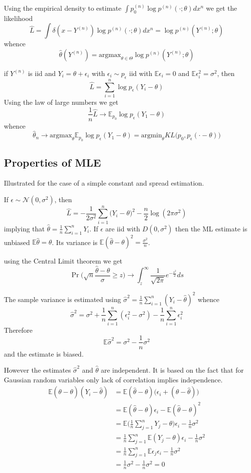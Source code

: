 \documentclass[a4paper]{article}
\newcommand{\Ncal}{\mathcal{N}}
\newcommand{\ex}{\mathbb{E}}
\begin{document}
Using the empirical density to estimate $\int p^{(n)}_0 \log p^{(n)}(\cdot;\theta) dx^n$ we get the likelihood
\[\hat{L} = \int \delta(x-Y^{(n)}) \log p^{(n)}(\cdot;\theta) dx^n = \log p^{(n)}(Y^{(n)};\theta)\]
whence 
\[\hat{\theta}(Y^{(n)}) = \text{argmax}_{\theta\in \Theta} \log p^{(n)}(Y^{(n)};\theta)\]

if $Y^{(n)}$ is iid and $Y_i = \theta + \epsilon_i$ with $\epsilon_i\sim p_\epsilon$ iid with $\ex \epsilon_i = 0$ and $\ex \epsilon_i^2 = \sigma^2$, then
\[\hat{L} = \sum_{i=1}^n\log p_\epsilon(Y_i-\theta)\]
Using the law of large numbers we get
\[\frac{1}{n}\hat{L} \to \ex_{p_0}\log p_\epsilon(Y_1-\theta)\]
whence
\[\hat{\theta}_n \to \text{argmax}_{\theta}\ex_{p_0}\log p_\epsilon(Y_1-\theta) = \text{argmin}_{\theta} KL\Big(p_0,p_\epsilon(\cdot - \theta)\Big)\]


\subsection{Properties of MLE} %
\label{sub:properties_of_mle}
Illustrated for the case of a simple constant and spread estimation.

If $\epsilon\sim \Ncal(0,\sigma^2)$, then 
\[\hat{L} = -\frac{1}{2\sigma^2}\sum_{i=1}^n\big(Y_i-\theta\big)^2 - \frac{n}{2}\log(2\pi \sigma^2)\]
implying that $\hat{\theta} = \frac{1}{n}\sum_{i=1}^n Y_i$.
If $\epsilon$ are iid with $D(0,\sigma^2)$ then the ML estimate is unbiased $\ex \hat{\theta} = \theta$.
Its variance is $\ex (\hat{\theta}-\theta)^2 = \frac{\sigma^2}{n}$.

using the Central Limit theorem we get
\[\Pr\big(\sqrt{n} \frac{\hat{\theta}-\theta}{\sigma} \geq z\big)\to \int_z^\infty \frac{1}{\sqrt{2\pi}} e^{-\frac{s^2}{2}}ds \]

The sample variance is estimated using $\hat{\sigma}^2 = \frac{1}{n}\sum_{i=1}^n(Y_i - \hat{\theta})^2$ whence
\[\hat{\sigma}^2 = \sigma^2 + \frac{1}{n}\sum_{i=1}^n (\epsilon_i^2 - \sigma^2) - \frac{1}{n} \sum_{i=1}^n \epsilon_i^2\]
Therefore
\[\ex \hat{\sigma}^2 = \sigma^2 - \frac{1}{n}\sigma^2 \]
and the estimate is biased.

However the estimates $\hat{\sigma}^2$ and $\hat{\theta}$ are independent. It is based on the fact that for Gaussian random variables only lack of correlation implies independence.
\begin{align*}
	\ex (\hat{\theta}-\theta) (Y_i - \hat{\theta})
	&= \ex (\hat{\theta}-\theta) \big(\epsilon_i + (\theta - \hat{\theta}) \big) \\
	&= \ex (\hat{\theta}-\theta)\epsilon_i - \ex (\hat{\theta}-\theta)^2 \\
	&= \ex \Big(\frac{1}{n}\sum_{j=1}^n Y_j-\theta\Big)\epsilon_i - \frac{1}{n}\sigma^2 \\
	&= \frac{1}{n}\sum_{j=1}^n \ex (Y_j - \theta)\epsilon_i - \frac{1}{n}\sigma^2 \\
	&= \frac{1}{n}\sum_{j=1}^n \ex \epsilon_j\epsilon_i - \frac{1}{n}\sigma^2 \\
	&= \frac{1}{n}\sigma^2 - \frac{1}{n}\sigma^2 = 0
\end{align*}
\end{document}

